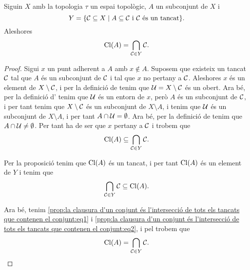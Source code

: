 \documentclass[../../Main.tex]{subfiles}
\begin{document}
	\begin{proposition}
		\label{prop:la clausura d'un conjunt és l'intersecció de tots els tancats que contenen el conjunt}
		Siguin \(X\) amb la topologia \(\tau\) un espai topològic, \(A\) un subconjunt de \(X\) i
		\[
		    Y=\{\mathcal{C}\subseteq X\mid A\subseteq\mathcal{C}\text{ i }\mathcal{C}\text{ és un tancat}\}.
		\]
		Aleshores
		\[
		    \operatorname{Cl}(A)=\bigcap_{\mathcal{C}\in Y}\mathcal{C}.
		\]
		\begin{proof}
			Sigui \(x\) un punt adherent a \(A\) amb \(x\notin A\). Suposem que existeix un tancat \(\mathcal{C}\) tal que \(A\) és un subconjunt de \(\mathcal{C}\) i tal que \(x\) no pertany a \(\mathcal{C}\). Aleshores \(x\) és un element de \(X\setminus\mathcal{C}\), i per la definició de  tenim que \(\mathcal{U}=X\setminus\mathcal{C}\) és un obert. Ara bé, per la definició d' tenim que \(\mathcal{U}\) és un entorn de \(x\), però \(A\) és un subconjunt de \(\mathcal{C}\), i per tant tenim que \(X\setminus\mathcal{C}\) és un subconjunt de \(X\setminus A\), i tenim que \(\mathcal{U}\) és un subconjunt de \(X\setminus A\), i per tant \(A\cap\mathcal{U}=\emptyset\). Ara bé, per la definició de  tenim que \(A\cap\mathcal{U}\neq\emptyset\). Per tant ha de ser que \(x\) pertany a \(\mathcal{C}\) i trobem que
			\begin{equation}
				\label{prop:la clausura d'un conjunt és l'intersecció de tots els tancats que contenen el conjunt:eq1}
				\operatorname{Cl}(A)\subseteq\bigcap_{\mathcal{C}\in Y}\mathcal{C}.
			\end{equation}
			
			Per la proposició  tenim que \(\operatorname{Cl}(A)\) és un tancat, i per tant \(\operatorname{Cl}(A)\) és un element de \(Y\) i tenim que
			\begin{equation}
				\label{prop:la clausura d'un conjunt és l'intersecció de tots els tancats que contenen el conjunt:eq2}
				\bigcap_{\mathcal{C}\in Y}\mathcal{C}\subseteq\operatorname{Cl}(A).
			\end{equation}
			
			Ara bé, tenim \eqref{prop:la clausura d'un conjunt és l'intersecció de tots els tancats que contenen el conjunt:eq1} i \eqref{prop:la clausura d'un conjunt és l'intersecció de tots els tancats que contenen el conjunt:eq2}, i pel  trobem que
			\[
			    \operatorname{Cl}(A)=\bigcap_{\mathcal{C}\in Y}\mathcal{C}.\qedhere
			\]
		\end{proof}
	\end{proposition}
\end{document}
